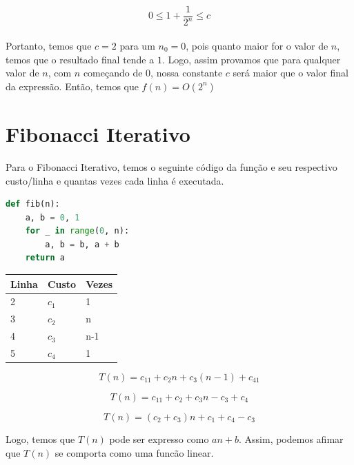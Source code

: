 \documentclass[a4paper, 12pt]{article}
\begin{document}
\begin{equation}
0 \leq 1+\frac{1}{2^n} \leq c
\end{equation}\\

Portanto, temos que $c=2$ para um $n_0=0$, pois quanto maior for o valor de $n$, temos que o resultado final tende a $1$. Logo, assim provamos que para qualquer valor de $n$, com $n$ começando de $0$, nossa constante $c$ será maior que o valor final da expressão. Então, temos que $f(n)=O(2^n)$

\newpage 
\section{Fibonacci Iterativo}

Para o Fibonacci Iterativo, temos o seguinte código da função e seu respectivo custo/linha e quantas vezes cada linha é executada.

\begin{lstlisting}[language=Python, caption= Código da função do Fibonacci Iterativo]
def fib(n):
    a, b = 0, 1
    for _ in range(0, n):
        a, b = b, a + b
    return a
\end{lstlisting}

\begin{center}
\begin{tabular}{|l|l|l|}
\hline
{\bf Linha} & {\bf Custo} & {\bf Vezes}\\
\hline
2 & $c_1$ & 1\\
\hline
3 & $c_2$ & n\\
\hline
4 & $c_3$ & n-1\\
\hline
5 & $c_4$ & 1\\
\hline
\end{tabular}
\end{center}

\begin{equation}
T(n) = c_11+c_2n+c_3(n-1)+c_41
\end{equation}

\begin{equation}
T(n) = c_11+c_2+c_3n-c_3+c_4
\end{equation}

\begin{equation}
T(n) = (c_2+c_3)n+c_1+c_4-c_3
\end{equation}

Logo, temos que $T(n)$ pode ser expresso como $an+b$. Assim, podemos afimar que $T(n)$ se comporta como uma funcão linear.\\
\end{document}
